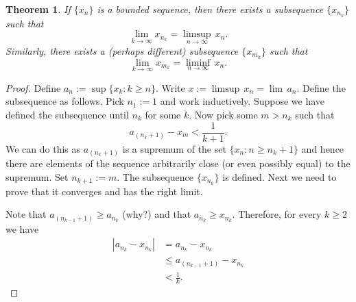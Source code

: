 \documentclass[12pt]{book}
\newcommand{\abs}[1]{\left\lvert {#1} \right\rvert}
\theoremstyle{plain}
\newtheorem{thm}{Theorem}[section]
\theoremstyle{remark}
\theoremstyle{definition}
\theoremstyle{exercise}
\theoremstyle{example}
\begin{document}
\begin{thm} \label{subseqlimsupinf:thm}
If $\{ x_n \}$ is a bounded sequence, then there exists a subsequence
$\{ x_{n_k} \}$ such that
\begin{equation*}
\lim_{k\to \infty} x_{n_k} = \limsup_{n \to \infty} \, x_n .
\end{equation*}
Similarly, there exists a (perhaps different) subsequence
$\{ x_{m_k} \}$ such that
\begin{equation*}
\lim_{k\to \infty} x_{m_k} = \liminf_{n \to \infty} \, x_n .
\end{equation*}
\end{thm}

\begin{proof}
Define $a_n := \sup \{ x_k : k \geq n \}$.
Write
$x := \limsup \, x_n = \lim\, a_n$.  Define the subsequence as follows.
Pick $n_1 := 1$ and work inductively.  Suppose we have
defined the subsequence until $n_k$ for some $k$.  Now pick some $m > n_k$
such that
\begin{equation*}
a_{(n_k+1)} - x_m < \frac{1}{k+1} .
\end{equation*}
We can do this as $a_{(n_k+1)}$ is a supremum of the
set $\{ x_n : n \geq n_k + 1 \}$ and hence there are elements
of the sequence arbitrarily close (or even possibly equal) to the supremum.
Set $n_{k+1} :=  m$.  The subsequence $\{ x_{n_k} \}$ is defined.  Next we
need to prove that it converges and has the right limit.

Note that
$a_{(n_{k-1}+1)} \geq a_{n_k}$ (why?) and that $a_{n_{k}} \geq x_{n_k}$.
Therefore, for every $k \geq 2$ we have
\begin{equation*}
\begin{split}
\abs{a_{n_k} - x_{n_k}} & = 
a_{n_k} - x_{n_k}
\\
& \leq
a_{(n_{k-1}+1)} - x_{n_k}
\\
& < \frac{1}{k} .
\end{split}
\end{equation*}


\end{proof}
\end{document}
